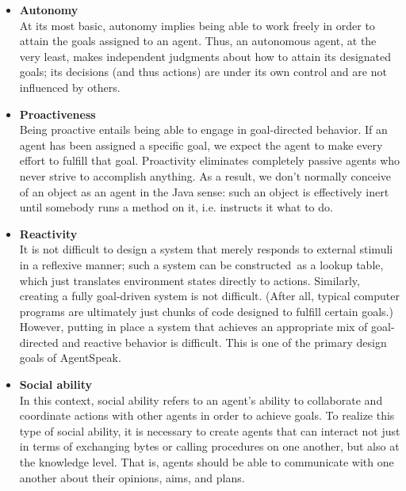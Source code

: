 \begin{itemize}
    \item \textbf{Autonomy}\\
    
    At its most basic, autonomy implies being able to work freely in order to attain the goals assigned to an agent. Thus, an autonomous agent, at the very least, makes independent judgments about how to attain its designated goals; its decisions (and thus actions) are under its own control and are not influenced by others.

    \vspace{.5cm}
    
    \item \textbf{Proactiveness}\\
    Being proactive entails being able to engage in goal-directed behavior. If an agent has been assigned a specific goal, we expect the agent to make every effort to fulfill that goal. Proactivity eliminates completely passive agents who never strive to accomplish anything. As a result, we don't normally conceive of an object as an agent in the Java sense: such an object is effectively inert until somebody runs a method on it, i.e. instructs it what to do.

    \vspace{.5cm}
    
    \item \textbf{Reactivity}\\
    It is not difficult to design a system that merely responds to external stimuli in a reflexive manner; such a system can be constructed as a lookup table, which just translates environment states directly to actions. Similarly, creating a fully goal-driven system is not difficult. (After all, typical computer programs are ultimately just chunks of code designed to fulfill certain goals.) However, putting in place a system that achieves an appropriate mix of goal-directed and reactive behavior is difficult. This is one of the primary design goals of AgentSpeak.

    \vspace{.5cm}
    
    \item \textbf{Social ability}\\
    In this context, social ability refers to an agent's ability to collaborate and coordinate actions with other agents in order to achieve goals. To realize this type of social ability, it is necessary to create agents that can interact not just in terms of exchanging bytes or calling procedures on one another, but also at the knowledge level. That is, agents should be able to communicate with one another about their opinions, aims, and plans.
    
    \vspace{.5cm}
    
\end{itemize}

